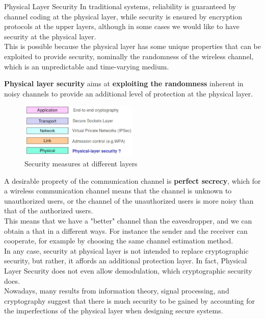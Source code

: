 \begin{section}{Physical Layer Security}
  In traditional systems, reliability is guaranteed by channel coding at the physical layer, while 
  security is ensured by encryption protocols at the upper layers, although in some cases we would 
  like to have security at the physical layer.\\
  This is possible because the physical layer has some unique properties that can be exploited to
  provide security, nominally the randomness of the wireless channel, which is an unpredictable
  and time-varying medium.\\

  \begin{boxH}
    \textbf{Physical layer security} aims at \textbf{exploiting the randomness} inherent in noisy channels to provide
    an additional level of protection at the physical layer.
  \end{boxH}
  
  \begin{figure}[h]
    \centering
    \includegraphics[width=0.5\textwidth]{img/wireless/layer security.png}
    \caption{Security measures at different layers}
    \label{fig:layer_security}
  \end{figure}
  A desirable proprety of the communication channel is \textbf{perfect secrecy}, which for a 
  wireless communication channel means that the channel is unknown to unauthorized users, or the 
  channel of the unauthorized users is more noisy than that of the authorized users.\\
  This means that we have a "better" channel than the eavesdropper, and we can obtain a that in 
  a different ways. For instance the sender and the receiver can cooperate, for example by choosing
  the same channel estimation method.\\

  In any case, security at physical layer is not intended to replace cryptographic security, but rather, it
  affords an additional protection layer. In fact, Physical Layer Security does not even allow 
  demodulation, which cryptographic security does.\\
  Nowadays, many results from information theory, signal processing, and cryptography
  suggest that there is much security to be gained by accounting for the imperfections of the
  physical layer when designing secure systems.


\end{section}
